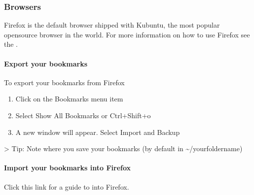 \documentclass[letterpaper,10pt,english]{sphinxmanual}
\begin{document}
\subsubsection{Browsers}
\label{\detokenize{docs/software-management/software:browsers}}
\sphinxAtStartPar
Firefox is the default browser shipped with Kubuntu, the most popular open\sphinxhyphen{}source browser in the world. For more information on how to use Firefox see the .


\paragraph{Export your bookmarks}
\label{\detokenize{docs/software-management/software:export-your-bookmarks}}
\sphinxAtStartPar
To export your bookmarks from Firefox
\begin{enumerate}
%
\item {} 
\sphinxAtStartPar
Click on the Bookmarks menu item

\item {} 
\sphinxAtStartPar
Select Show All Bookmarks or Ctrl+Shift+o

\item {} 
\sphinxAtStartPar
A new window will appear. Select Import and Backup

\end{enumerate}

\sphinxAtStartPar
\textgreater{} Tip: Note where you save your bookmarks (by default in \textasciitilde{}/yourfoldername)


\paragraph{Import your bookmarks into Firefox}
\label{\detokenize{docs/software-management/software:import-your-bookmarks-into-firefox}}
\sphinxAtStartPar
Click this link for a guide to  into Firefox.
\end{document}
